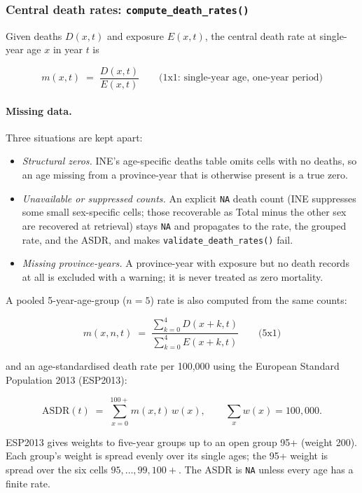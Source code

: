 \documentclass[11pt]{article}
\newcommand{\fn}[1]{\texttt{#1}}
\begin{document}
\subsubsection{Central death rates: \fn{compute\_death\_rates()}}
\label{sec:death-rates}

Given deaths $D(x,t)$ and exposure $E(x,t)$, the central death rate at
single-year age $x$ in year $t$ is

\begin{equation}
m(x,t) \;=\; \frac{D(x,t)}{E(x,t)} \qquad \text{(1x1: single-year age, one-year period)}
\end{equation}

\paragraph{Missing data.} Three situations are kept apart:
\begin{itemize}
  \item \emph{Structural zeros.} INE's age-specific deaths table omits cells
  with no deaths, so an age missing from a province-year that is otherwise
  present is a true zero.
  \item \emph{Unavailable or suppressed counts.} An explicit \fn{NA} death
  count (INE suppresses some small sex-specific cells; those recoverable as
  Total minus the other sex are recovered at retrieval) stays \fn{NA} and
  propagates to the rate, the grouped rate, and the ASDR, and makes
  \fn{validate\_death\_rates()} fail.
  \item \emph{Missing province-years.} A province-year with exposure but no
  death records at all is excluded with a warning; it is never treated as
  zero mortality.
\end{itemize}

A pooled 5-year-age-group ($n=5$) rate is also computed from the same counts:

\begin{equation}
m(x,n,t) \;=\; \frac{\sum_{k=0}^{4} D(x+k,t)}{\sum_{k=0}^{4} E(x+k,t)}
\qquad \text{(5x1)}
\end{equation}

and an age-standardised death rate per 100{,}000 using the European Standard
Population 2013 (ESP2013):

\begin{equation}
\mathrm{ASDR}(t) \;=\; \sum_{x=0}^{100+} m(x,t)\, w(x), \qquad \sum_x w(x) = 100{,}000.
\end{equation}

ESP2013 gives weights to five-year groups up to an open group 95+ (weight
200). Each group's weight is spread evenly over its single ages; the 95+
weight is spread over the six cells $95,\dots,99,100+$. The ASDR is \fn{NA}
unless every age has a finite rate.
\end{document}
